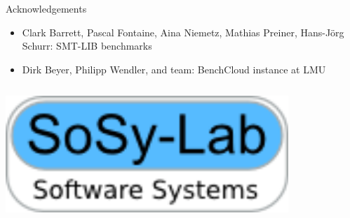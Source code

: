 \documentclass[table]{beamer}
\def\emph#1{\textcolor{MYblue}{#1}}
\begin{document}
\begin{frame}{Acknowledgements}
  \begin{itemize}
    \item \emph{Clark Barrett, Pascal Fontaine, Aina Niemetz, Mathias Preiner, Hans-Jörg Schurr}: SMT-LIB benchmarks
    \item \emph{Dirk Beyer, Philipp Wendler, and team}: BenchCloud instance at LMU
  \end{itemize}
  \bigskip

  \begin{columns}
    \begin{column}{.3\textwidth}
      \includegraphics[width=0.8\textwidth]{sosylogo.png}
    \end{column}
  \end{columns}
\end{frame}
\end{document}
